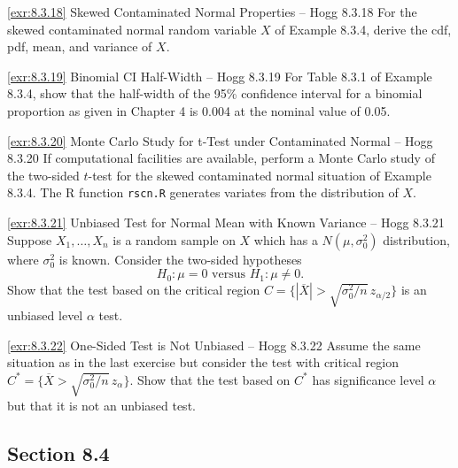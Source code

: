 \begin{exercise}{\ref{exr:8.3.18} Skewed Contaminated Normal Properties -- Hogg 8.3.18}\label{exr:8.3.18}
For the skewed contaminated normal random variable $X$ of Example 8.3.4, derive the cdf, pdf, mean, and variance of $X$.
\end{exercise}

\begin{exercise}{\ref{exr:8.3.19} Binomial CI Half-Width -- Hogg 8.3.19}\label{exr:8.3.19}
For Table 8.3.1 of Example 8.3.4, show that the half-width of the 95\% confidence interval for a binomial proportion as given in Chapter 4 is 0.004 at the nominal value of 0.05.
\end{exercise}

\begin{exercise}{\ref{exr:8.3.20} Monte Carlo Study for t-Test under Contaminated Normal -- Hogg 8.3.20}\label{exr:8.3.20}
If computational facilities are available, perform a Monte Carlo study of the two-sided $t$-test for the skewed contaminated normal situation of Example 8.3.4. The R function \texttt{rscn.R} generates variates from the distribution of $X$.
\end{exercise}

\begin{exercise}{\ref{exr:8.3.21} Unbiased Test for Normal Mean with Known Variance -- Hogg 8.3.21}\label{exr:8.3.21}
Suppose $X_1, \ldots, X_n$ is a random sample on $X$ which has a $N(\mu, \sigma_0^2)$ distribution, where $\sigma_0^2$ is known. Consider the two-sided hypotheses
\[
H_0: \mu = 0 \text{ versus } H_1: \mu \neq 0.
\]
Show that the test based on the critical region $C = \{|\overline{X}| > \sqrt{\sigma_0^2/n} \, z_{\alpha/2}\}$ is an unbiased level $\alpha$ test.
\end{exercise}

\begin{exercise}{\ref{exr:8.3.22} One-Sided Test is Not Unbiased -- Hogg 8.3.22}\label{exr:8.3.22}
Assume the same situation as in the last exercise but consider the test with critical region $C^* = \{\overline{X} > \sqrt{\sigma_0^2/n} \, z_\alpha\}$. Show that the test based on $C^*$ has significance level $\alpha$ but that it is not an unbiased test.
\end{exercise}

\subsection*{Section 8.4}

